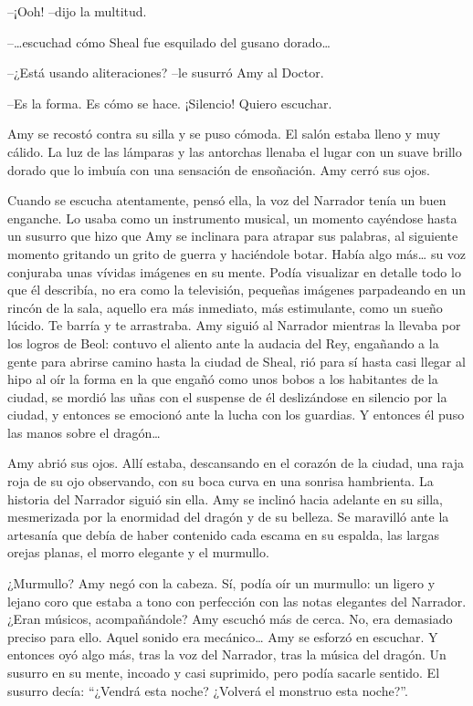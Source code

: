 {--¡Ooh! --dijo la multitud.}

{--\ldots{}}{escuchad cómo Sheal fue esquilado del gusano
	dorado\ldots{}}

{--¿Está usando aliteraciones? --le susurró Amy al Doctor.}

{--Es la forma. Es cómo se hace. ¡Silencio! Quiero escuchar.}

{Amy se recostó contra su silla y se puso cómoda. El salón estaba lleno
	y muy cálido. La luz de las lámparas y las antorchas llenaba el lugar
	con un suave brillo dorado que lo imbuía con una sensación de
ensoñación. Amy cerró sus ojos.}

{Cuando se escucha atentamente, pensó ella, la voz del Narrador tenía un
	buen enganche. Lo usaba como un instrumento musical, un momento
	cayéndose hasta un susurro que hizo que Amy se inclinara para atrapar
	sus palabras, al siguiente momento gritando un grito de guerra y
	haciéndole botar. Había algo más\ldots{} su voz conjuraba unas vívidas
	imágenes en su mente. Podía visualizar en detalle todo lo que él
	describía, no era como la televisión, pequeñas imágenes parpadeando en
	un rincón de la sala, aquello era más inmediato, más estimulante, como
	un sueño lúcido. Te barría y te arrastraba. Amy siguió al Narrador
	mientras la llevaba por los logros de Beol: contuvo el aliento ante la
	audacia del Rey, engañando a la gente para abrirse camino hasta la
	ciudad de Sheal, rió para sí hasta casi llegar al hipo al oír la forma
	en la que engañó como unos bobos a los habitantes de la ciudad, se
	mordió las uñas con el suspense de él deslizándose en silencio por la
	ciudad, y entonces se emocionó ante la lucha con los guardias. Y
	entonces él puso las manos sobre el dragón\ldots{}}

{Amy abrió sus ojos. Allí estaba, descansando en el corazón de la
	ciudad, una raja roja de su ojo observando, con su boca curva en una
	sonrisa hambrienta. La historia del Narrador siguió sin ella. Amy se
	inclinó hacia adelante en su silla, mesmerizada por la enormidad del
	dragón y de su belleza. Se maravilló ante la artesanía que debía de
	haber contenido cada escama en su espalda, las largas orejas planas, el
morro elegante y el murmullo.}

{¿Murmullo? Amy negó con la cabeza. Sí, podía oír un murmullo: un ligero
	y lejano coro que estaba a tono con perfección con las notas elegantes
	del Narrador. ¿Eran músicos, acompañándole? Amy escuchó más de cerca.
	No, era demasiado preciso para ello. Aquel sonido era mecánico\ldots{}
	Amy se esforzó en escuchar. Y entonces oyó algo más, tras la voz del
	Narrador, tras la música del dragón. Un susurro en su mente, incoado y
	casi suprimido, pero podía sacarle sentido. El susurro decía: ``¿Vendrá
esta noche? ¿Volverá el monstruo esta noche?''.}

